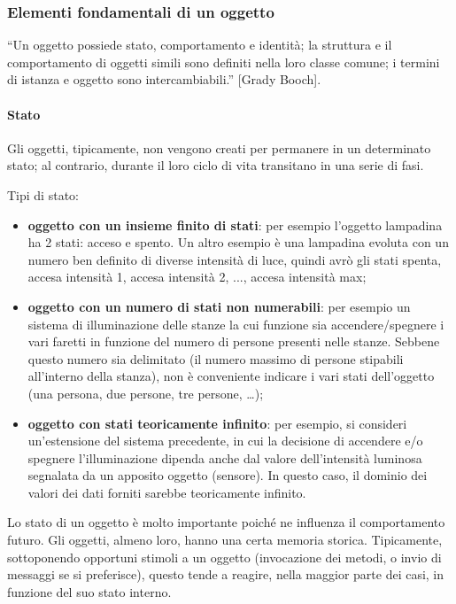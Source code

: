 \subsubsection{Elementi fondamentali di un oggetto}

“Un oggetto possiede stato, comportamento e identità; la struttura e il comportamento di oggetti simili sono definiti nella loro classe comune; i termini di istanza e oggetto sono intercambiabili.” [Grady Booch].

\paragraph{Stato}

Gli oggetti, tipicamente, non vengono creati per permanere in un determinato stato; al contrario, durante il loro ciclo di vita transitano in una serie di fasi.

Tipi di stato:
\begin{itemize}
\item \textbf{oggetto con un insieme finito di stati}: per esempio l'oggetto lampadina ha 2 stati: acceso e spento. Un altro esempio è una lampadina evoluta con un numero ben definito di diverse intensità di luce, quindi avrò gli stati spenta, accesa intensità 1, accesa intensità 2, ..., accesa intensità max;

\item \textbf{oggetto con un numero di stati non numerabili}: per esempio un sistema di illuminazione delle stanze la cui funzione sia accendere/spegnere i vari faretti in funzione del numero di persone presenti nelle stanze. Sebbene questo numero sia delimitato (il numero massimo di persone stipabili all'interno della stanza), non è conveniente indicare i vari stati dell'oggetto (una persona, due persone, tre persone, …);

\item \textbf{oggetto con stati teoricamente infinito}: per esempio, si consideri un'estensione del sistema precedente, in cui la decisione di accendere e/o spegnere l'illuminazione dipenda anche dal valore dell'intensità luminosa segnalata da un apposito oggetto (sensore). In questo caso, il dominio dei valori dei dati forniti sarebbe teoricamente infinito.

\end{itemize}

Lo stato di un oggetto è molto importante poiché ne influenza il comportamento futuro. Gli oggetti, almeno loro, hanno una certa memoria storica. Tipicamente, sottoponendo opportuni stimoli a un oggetto (invocazione dei metodi, o invio di messaggi se si preferisce), questo tende a reagire, nella maggior parte dei casi, in funzione del suo stato interno.

